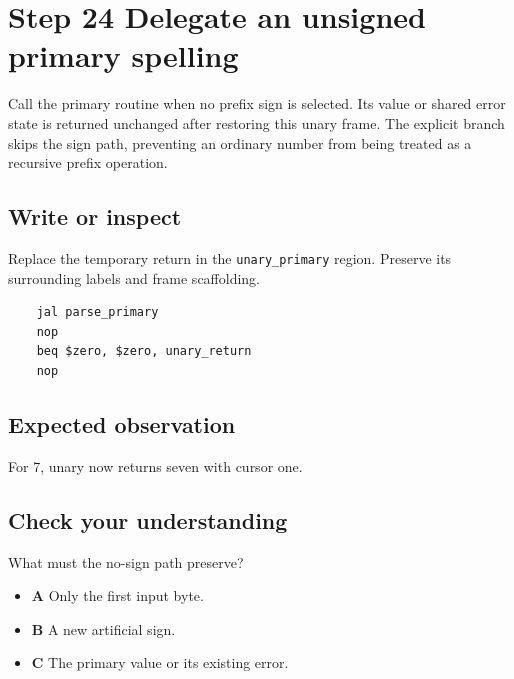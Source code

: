 \section{Step 24 Delegate an unsigned primary spelling}\label{expression-s24}

Call the primary routine when no prefix sign is selected. Its value or shared error state is returned unchanged after restoring this unary frame. The explicit branch skips the sign path, preventing an ordinary number from being treated as a recursive prefix operation.

\subsection{Write or inspect}
Replace the temporary return in the \texttt{unary\_primary} region. Preserve its surrounding labels and frame scaffolding.

\begin{verbatim}
    jal parse_primary
    nop
    beq $zero, $zero, unary_return
    nop
\end{verbatim}
\subsection{Expected observation}
For 7, unary now returns seven with cursor one.

\subsection{Check your understanding}
What must the no-sign path preserve?

\begin{itemize}
  \item \textbf{A} Only the first input byte.
  \item \textbf{B} A new artificial sign.
  \item \textbf{C} The primary value or its existing error.
\end{itemize}
